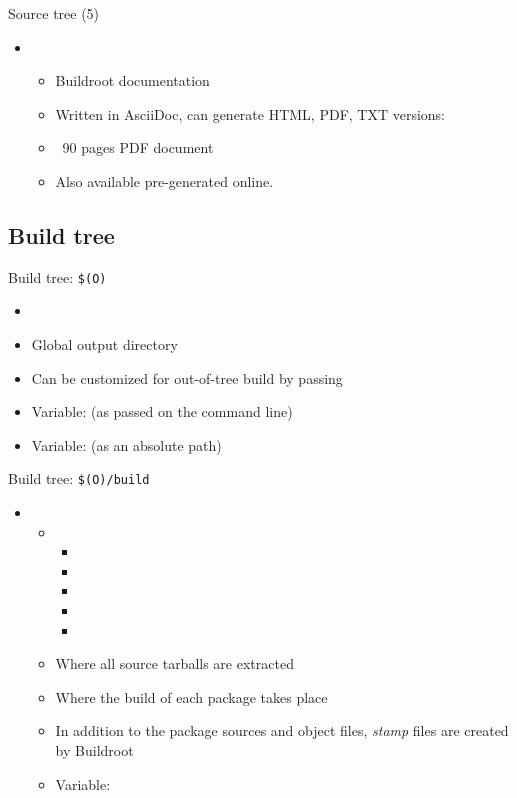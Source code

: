 \begin{frame}{Source tree (5)}
  \begin{itemize}
  \item {}
    \begin{itemize}
    \item Buildroot documentation
    \item Written in AsciiDoc, can generate HTML, PDF, TXT versions:
    \item ~90 pages PDF document
    \item Also available pre-generated online.
    \end{itemize}
  \end{itemize}
\end{frame}

\subsection{Build tree}

\begin{frame}{Build tree: {\tt \$(O)}}
  \begin{itemize}
  \item {}
  \item Global output directory
  \item Can be customized for out-of-tree build by passing 
  \item Variable:  (as passed on the command line)
  \item Variable:  (as an absolute path)
  \end{itemize}
\end{frame}

\begin{frame}{Build tree: {\tt \$(O)/build}}
  \begin{itemize}
  \item {}
    \begin{itemize}
    \item {}
      \begin{itemize}
        \tiny
      \item {}
      \item {}
      \item {}
      \item {}
      \item {}
      \end{itemize}
    \item Where all source tarballs are extracted
    \item Where the build of each package takes place
    \item In addition to the package sources and object files, {\em
        stamp} files are created by Buildroot
    \item Variable: 
    \end{itemize}
  \end{itemize}
\end{frame}

